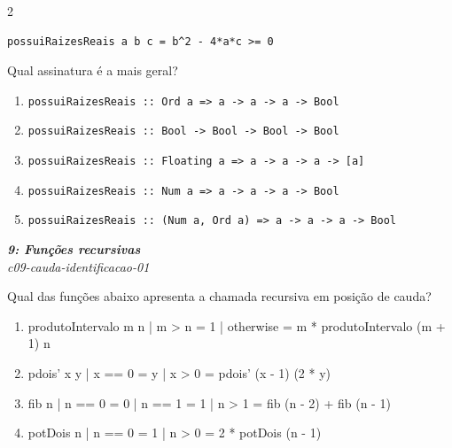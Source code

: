 \documentclass[a4paper,10pt,brazil]{article}
\begin{document}
\begin{multicols}{2}
\begin{verbatim}
possuiRaizesReais a b c = b^2 - 4*a*c >= 0
\end{verbatim}

Qual assinatura é a mais geral?

\begin{enumerate}
  \item \texttt{possuiRaizesReais :: Ord a => a -> a -> a -> Bool}
  \item \texttt{possuiRaizesReais :: Bool -> Bool -> Bool -> Bool}
  \item \texttt{possuiRaizesReais :: Floating a => a -> a -> a -> [a]}
  \item \texttt{possuiRaizesReais :: Num a => a -> a -> a -> Bool}
  \item \texttt{possuiRaizesReais :: (Num a, Ord a) => a -> a -> a -> Bool}

\end{enumerate}

\begin{flushright}
  \footnotesize
  \textit{\textbf{9: Funções recursivas}}\\
  \textit{c09-cauda-identificacao-01}\\

\end{flushright}
Qual das funções abaixo apresenta a chamada recursiva em posição de cauda?

\begin{enumerate}
  \item \begin{haskellcode}
produtoIntervalo m n
  | m > n     = 1
  | otherwise = m * produtoIntervalo (m + 1) n
\end{haskellcode}

  \item \begin{haskellcode}
pdois' x y
  | x == 0 = y
  | x > 0  = pdois' (x - 1) (2 * y)
\end{haskellcode}

  \item \begin{haskellcode}
fib n
  | n == 0 = 0
  | n == 1 = 1
  | n > 1  = fib (n - 2) + fib (n - 1)
\end{haskellcode}

  \item \begin{haskellcode}
potDois n
  | n == 0 = 1
  | n > 0  = 2 * potDois (n - 1)
\end{haskellcode}


\end{enumerate}
\end{multicols}
\end{document}
